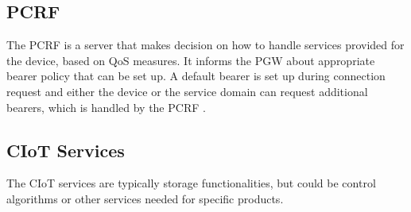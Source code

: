 \subsection{\gls{PCRF}}
The \gls{PCRF} is a server that makes decision on how to handle services provided for the device, based on \gls{QoS} measures. It informs the \gls{PGW} about appropriate bearer policy that can be set up. A default bearer is set up during connection request and either the device or the service domain can request additional bearers, which is handled by the \gls{PCRF} \citep[ch. 3]{book_LTE_for_UMTS}.

\subsection{\gls{CIoT} Services}
The \gls{CIoT} services are typically storage functionalities, but could be control algorithms or other services needed for specific products. 

